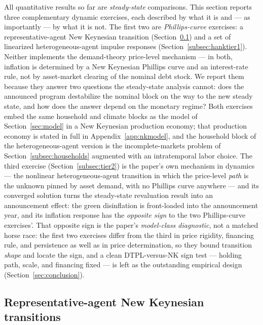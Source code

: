 \documentclass[12pt]{article}
\begin{document}
All quantitative results so far are \emph{steady-state} comparisons. This
section reports three complementary dynamic exercises, each described by
what it is and --- as importantly --- by what it is not. The first two are
\emph{Phillips-curve} exercises: a representative-agent New Keynesian
transition (Section~\ref{subsec:ranktrans}) and a set of linearized
heterogeneous-agent impulse responses (Section~\ref{subsec:hanktier1}).
Neither implements the demand-theory price-level mechanism --- in both,
inflation is determined by a New Keynesian Phillips curve and an
interest-rate rule, not by asset-market clearing of the nominal debt stock.
We report them because they answer two questions the steady-state analysis
cannot: does the announced program destabilize the nominal block on the way
to the new steady state, and how does the answer depend on the monetary
regime? Both exercises embed the same household and climate blocks as the
model of Section~\ref{sec:model} in a New Keynesian production economy;
that production economy is stated in full in
Appendix~\ref{app:nkmodel}, and the household block of the heterogeneous-agent
version is the incomplete-markets problem of
Section~\ref{subsec:households} augmented with an intratemporal labor
choice. The third exercise (Section~\ref{subsec:tier2}) is the paper's own
mechanism in dynamics --- the nonlinear heterogeneous-agent transition in
which the price-level \emph{path} is the unknown pinned by asset demand,
with no Phillips curve anywhere --- and its converged solution turns the
steady-state revaluation result into an announcement effect: the green
disinflation is front-loaded into the announcement year, and its inflation
response has the \emph{opposite sign} to the two Phillips-curve exercises'.
That opposite sign is the paper's \emph{model-class diagnostic}, not a
matched horse race: the first two exercises differ from the third in price
rigidity, financing rule, and persistence as well as in price determination,
so they bound transition \emph{shape} and locate the sign, and a clean
DTPL-versus-NK sign test --- holding path, scale, and financing fixed ---
is left as the outstanding empirical design (Section~\ref{sec:conclusion}).

\subsection{Representative-agent New Keynesian transitions}
\label{subsec:ranktrans}
\end{document}
